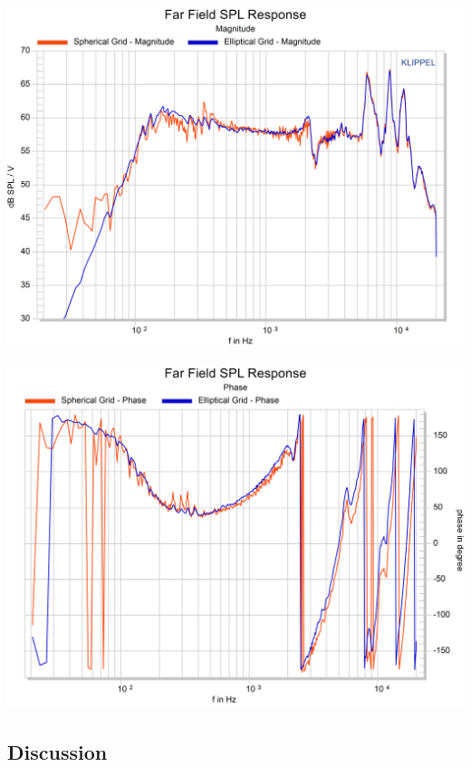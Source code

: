 \documentclass{report}
\begin{document}
\begin{minipage}{0.5\textwidth}
\begin{center}
	\includegraphics[width=.9\textwidth]{GridOpti/Mag_Compa_El_Sph}
    \captionsetup{hypcap=false} 
	\label{fig:comp_ElSPh_SPL}
\end{center}
\end{minipage}
\begin{minipage}{0.5\textwidth}
\begin{center}
	\includegraphics[width=.9\textwidth]{GridOpti/Phase_Compa_El_Sph}
    \captionsetup{hypcap=false} 
	\label{fig:comp_ElSPh_Pow}
\end{center}
\end{minipage}


\subsection{Discussion}
\end{document}
